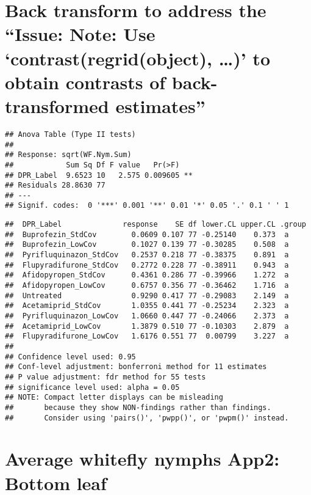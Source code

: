 \documentclass[
]{article}
\begin{document}
\hypertarget{back-transform-to-address-the-issue-note-use-contrastregridobject-to-obtain-contrasts-of-back-transformed-estimates}{%
\section{Back transform to address the ``Issue: Note: Use
`contrast(regrid(object), \ldots)' to obtain contrasts of
back-transformed
estimates''}\label{back-transform-to-address-the-issue-note-use-contrastregridobject-to-obtain-contrasts-of-back-transformed-estimates}}

\begin{verbatim}
## Anova Table (Type II tests)
## 
## Response: sqrt(WF.Nym.Sum)
##            Sum Sq Df F value   Pr(>F)   
## DPR_Label  9.6523 10   2.575 0.009605 **
## Residuals 28.8630 77                    
## ---
## Signif. codes:  0 '***' 0.001 '**' 0.01 '*' 0.05 '.' 0.1 ' ' 1
\end{verbatim}

\begin{verbatim}
##  DPR_Label              response    SE df lower.CL upper.CL .group
##  Buprofezin_StdCov        0.0609 0.107 77 -0.25140    0.373  a    
##  Buprofezin_LowCov        0.1027 0.139 77 -0.30285    0.508  a    
##  Pyrifluquinazon_StdCov   0.2537 0.218 77 -0.38375    0.891  a    
##  Flupyradifurone_StdCov   0.2772 0.228 77 -0.38911    0.943  a    
##  Afidopyropen_StdCov      0.4361 0.286 77 -0.39966    1.272  a    
##  Afidopyropen_LowCov      0.6757 0.356 77 -0.36462    1.716  a    
##  Untreated                0.9290 0.417 77 -0.29083    2.149  a    
##  Acetamiprid_StdCov       1.0355 0.441 77 -0.25234    2.323  a    
##  Pyrifluquinazon_LowCov   1.0660 0.447 77 -0.24066    2.373  a    
##  Acetamiprid_LowCov       1.3879 0.510 77 -0.10303    2.879  a    
##  Flupyradifurone_LowCov   1.6176 0.551 77  0.00799    3.227  a    
## 
## Confidence level used: 0.95 
## Conf-level adjustment: bonferroni method for 11 estimates 
## P value adjustment: fdr method for 55 tests 
## significance level used: alpha = 0.05 
## NOTE: Compact letter displays can be misleading
##       because they show NON-findings rather than findings.
##       Consider using 'pairs()', 'pwpp()', or 'pwpm()' instead.
\end{verbatim}

\hypertarget{average-whitefly-nymphs-app2-bottom-leaf}{%
\section{Average whitefly nymphs App2: Bottom
leaf}\label{average-whitefly-nymphs-app2-bottom-leaf}}
\end{document}
